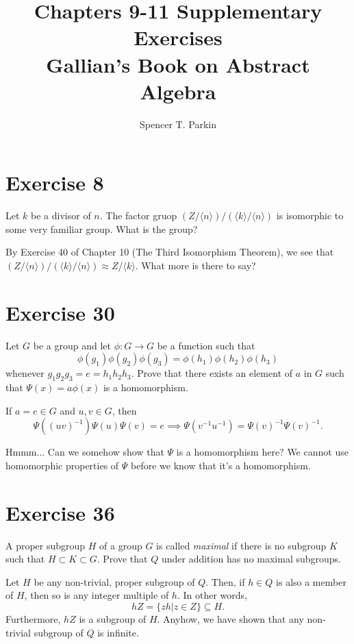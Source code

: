 \documentclass[12pt]{article}
\title{Chapters 9-11 Supplementary Exercises\\Gallian's Book on Abstract Algebra}
\author{Spencer T. Parkin}
\begin{document}
\maketitle

\section*{Exercise 8}

Let $k$ be a divisor of $n$.  The factor gruop $(Z/\langle n\rangle)/(\langle k\rangle/\langle n\rangle)$
is isomorphic to some very familiar group.  What is the group?

By Exercise 40 of Chapter 10 (The Third Isomorphism Theorem), we
see that $(Z/\langle n\rangle)/(\langle k\rangle/\langle n\rangle)\approx Z/\langle k\rangle$.
What more is there to say?

\section*{Exercise 30}

Let $G$ be a group and let $\phi:G\to G$ be a function such that
\begin{equation*}
\phi(g_1)\phi(g_2)\phi(g_3) = \phi(h_1)\phi(h_2)\phi(h_3)
\end{equation*}
whenever $g_1g_2g_3=e=h_1h_2h_3$.  Prove that there exists an element of $a$
in $G$ such that $\Psi(x)=a\phi(x)$ is a homomorphism.

If $a=e\in G$ and $u,v\in G$, then
\begin{equation*}
\Psi((uv)^{-1})\Psi(u)\Psi(v) = e\implies \Psi(v^{-1}u^{-1})=\Psi(v)^{-1}\Psi(v)^{-1}.
\end{equation*}

Hmmm...  Can we somehow show that $\Psi$ is a homomorphism here?
We cannot use homomorphic properties of $\Psi$ before we know that it's
a homomorphism.

\section*{Exercise 36}

A proper subgroup $H$ of a group $G$ is called {\it maximal} if there is no
subgroup $K$ such that $H\subset K\subset G$.  Prove that $Q$ under
addition has no maximal subgroups.

Let $H$ be any non-trivial, proper subgroup of $Q$.  Then, if $h\in Q$ is also a
member of $H$, then so is any integer multiple of $h$.  In other words,
\begin{equation*}
hZ=\{zh|z\in Z\}\subseteq H.
\end{equation*}
Furthermore, $hZ$ is a subgroup of $H$. Anyhow, we have shown that any non-trivial subgroup
of $Q$ is infinite.
\end{document}
